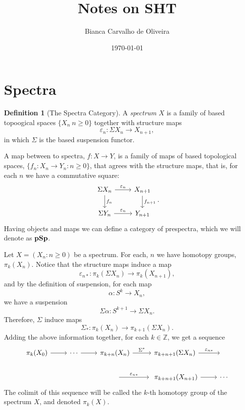\documentclass[a4paper,english,11pt]{article}
\title{Notes on SHT}
\author{Bianca Carvalho de Oliveira}
\date{\today}
\theoremstyle{definition}
\newtheorem{Def}{Definition}
\theoremstyle{plain}
\theoremstyle{remark}
\newcommand{\pSp}{\textbf{\text{pSp}}}
\begin{document}
\maketitle
\section{Spectra}
\begin{Def}[The Spectra Category]
    A \textit{spectrum} \(X\) is a family of based topoogical spaces \(\{X_n\:n\geq 0\}\) together with structure maps
    \[\varepsilon_n:\Sigma X_n\to X_{n+1},\]
    in which \(\Sigma \) is the based suspension functor.

    A map between to spectra, \(f:X\to Y\), is a family of maps of based topological spaces, \(\{f_n:X_n\to Y_n:n\geq 0\}\), that agrees with the structure maps, that is, for each \(n\) we have a commutative square:
    \begin{equation*}
      \begin{tikzcd}
        \Sigma X_n \arrow{r}{\varepsilon_n}\arrow{d}{f_n}& X_{n+1}\arrow{d}{f_{n+1}}\\
        \Sigma Y_n \arrow{r}{\varepsilon_n}& Y_{n+1}
      \end{tikzcd}.
    \end{equation*}
    Having objects and maps we can define a category of prespectra, which we will denote as \(\pSp\). 
\end{Def}
Let \(X=(X_n:n\geq 0)\) be a spectrum. For each, \(n\) we have homotopy groups, \(\pi_k(X_n)\). Notice that the structure maps induce a map
\[\varepsilon_{n\ast}:\pi_k(\Sigma X_n)\to\pi_k(X_{n+1}),\]
and by the definition of suspension, for each map
\[\alpha:S^k\to X_n,\]
we have a suspension
\[\Sigma\alpha:S^{k+1}\to \Sigma X_n.\]
Therefore, \(\Sigma\) induce maps
\[\Sigma_\ast:\pi_k(X_n)\to\pi_{k+1}(\Sigma X_n).\]
Adding the above information together, for each \(k\in\mathbb{Z}\), we get a sequence
\begin{equation*}
    \begin{tikzcd}
        \pi_k(X_0)\arrow{r}&\cdots\arrow{r}&\pi_{k+n}(X_n)\arrow{r}{\Sigma^\ast}&\pi_{k+n+1}(\Sigma X_n)\arrow{r}{\varepsilon_{n\ast}}&\  \\
        \ &\ &\ \arrow{r}{\varepsilon_{n\ast}}&\ \pi_{k+n+1}(X_{n+1})\arrow{r}&\cdots
    \end{tikzcd}
\end{equation*}
The colimit of this sequence will be called the \(k\)-th homotopy group of the spectrum \(X\), and denoted \(\pi_k(X)\).\\
\end{document}
